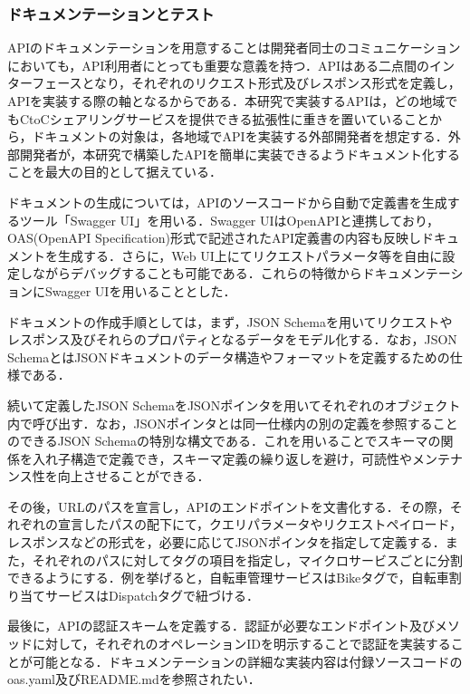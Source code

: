       \subsubsection{ドキュメンテーションとテスト}
        \label{sec:ドキュメンテーションとテスト}
          \par APIのドキュメンテーションを用意することは開発者同士のコミュニケーションにおいても，API利用者にとっても重要な意義を持つ．APIはある二点間のインターフェースとなり，それぞれのリクエスト形式及びレスポンス形式を定義し，APIを実装する際の軸となるからである．本研究で実装するAPIは，どの地域でもCtoCシェアリングサービスを提供できる拡張性に重きを置いていることから，ドキュメントの対象は，各地域でAPIを実装する外部開発者を想定する．外部開発者が，本研究で構築したAPIを簡単に実装できるようドキュメント化することを最大の目的として据えている．
          \par ドキュメントの生成については，APIのソースコードから自動で定義書を生成するツール「Swagger UI\cite{swagger-ui}」を用いる．Swagger UIはOpenAPIと連携しており，OAS(OpenAPI Specification)形式で記述されたAPI定義書の内容も反映しドキュメントを生成する．さらに，Web UI上にてリクエストパラメータ等を自由に設定しながらデバッグすることも可能である．これらの特徴からドキュメンテーションにSwagger UIを用いることとした．
          \par ドキュメントの作成手順としては，まず，JSON Schemaを用いてリクエストやレスポンス及びそれらのプロパティとなるデータをモデル化する．なお，JSON SchemaとはJSONドキュメントのデータ構造やフォーマットを定義するための仕様である．
          \par 続いて定義したJSON SchemaをJSONポインタを用いてそれぞれのオブジェクト内で呼び出す．なお，JSONポインタとは同一仕様内の別の定義を参照することのできるJSON Schemaの特別な構文である．これを用いることでスキーマの関係を入れ子構造で定義でき，スキーマ定義の繰り返しを避け，可読性やメンテナンス性を向上させることができる．
          \par その後，URLのパスを宣言し，APIのエンドポイントを文書化する．その際，それぞれの宣言したパスの配下にて，クエリパラメータやリクエストペイロード，レスポンスなどの形式を，必要に応じてJSONポインタを指定して定義する．また，それぞれのパスに対してタグの項目を指定し，マイクロサービスごとに分割できるようにする．例を挙げると，自転車管理サービスはBikeタグで，自転車割り当てサービスはDispatchタグで紐づける．
          \par 最後に，APIの認証スキームを定義する．認証が必要なエンドポイント及びメソッドに対して，それぞれのオペレーションIDを明示することで認証を実装することが可能となる．ドキュメンテーションの詳細な実装内容は付録ソースコードのoas.yaml及びREADME.mdを参照されたい．
